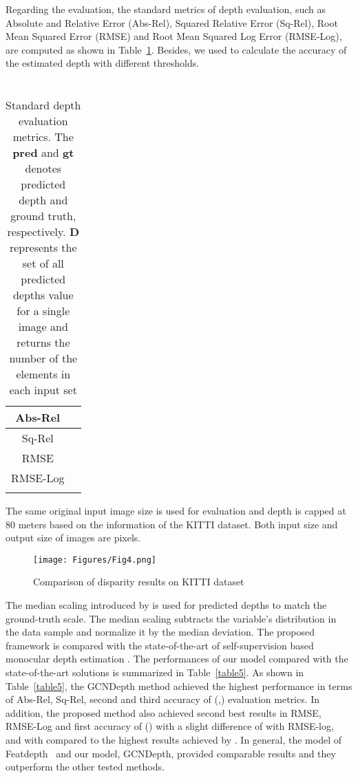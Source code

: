 \documentclass[journal]{IEEEtran}
\begin{document}
Regarding the evaluation, the standard metrics of depth evaluation, such as Absolute and Relative Error  (Abs-Rel), Squared Relative Error (Sq-Rel), Root Mean Squared Error (RMSE) and Root Mean Squared Log Error (RMSE-Log), are computed as shown in Table~\ref{table4}. Besides, we used  to calculate the accuracy of the estimated depth with different thresholds.

\begin{table}[h!]
\setlength{\tabcolsep}{6pt}
\centering
\captionsetup{justification=centering}
\caption{\\Standard depth evaluation metrics. The \textbf{pred} and \textbf{gt} denotes predicted depth and ground truth, respectively. \textbf{D} represents the set of all predicted depths value for a single image and  returns the number of the elements in each input set}
\def\arraystretch{2}
\begin{tabular}{|c|c|}
\hline
{Abs-Rel}  &  \\ \hline
{Sq-Rel}   &  \\ \hline
{RMSE}     &  \\ \hline
{RMSE-Log} &  \\ \hline
{}      &  \\ \hline
\end{tabular}
\label{table4}
\end{table}

The same original input image size is used for evaluation and depth is capped at 80 meters based on the information of the KITTI dataset. Both input size and output size of images are  pixels.
\begin{figure*}[t]
\centering
\texttt{[image: Figures/Fig4.png]}
\caption{Comparison of disparity results on KITTI dataset}
\label{fig4}
\end{figure*}

The median scaling introduced by \cite{Shu2020} is used for predicted depths to match the ground-truth scale. The median scaling subtracts the variable’s distribution in the data sample and normalize it by the median deviation. The proposed framework is compared with the state-of-the-art of self-supervision based monocular depth estimation \cite{Godard2018,Shu2020,Yang2018,Zhou2017,Yang2015,Mahjourian,Yin,Zou,Wang,Luo2018,Casser,Meng,Flow,Gordon,Zhou}. The performances of our model compared with the state-of-the-art solutions is summarized in Table~\ref{table5}. As shown in Table~\ref{table5}, the GCNDepth method achieved the highest performance in terms of Abs-Rel, Sq-Rel, second and third accuracy of ({},{}) evaluation metrics. In addition, the proposed method also achieved second best results in RMSE, RMSE-Log and first accuracy of ({}) with a slight difference of  with RMSE-log, and  with {} compared to the highest results achieved by \cite{Shu2020}. In general, the model of Featdepth~\cite{Shu2020} and our model, GCNDepth, provided comparable results and they outperform the other tested methods.
\end{document}
